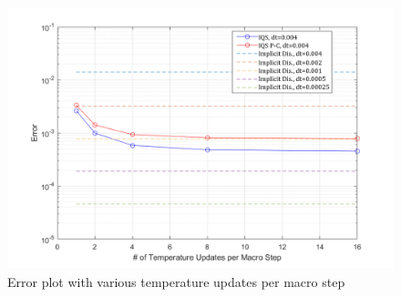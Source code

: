 \documentclass{elsarticle}
\begin{document}
\begin{figure}[htbp!]
\centering
\includegraphics[height=3in]{figures/lra_mp.png}
\caption{Error plot with various temperature updates per macro step}
\label{fig:mp}
\end{figure}
\end{document}
